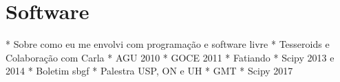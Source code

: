 \chapter{Software}

* Sobre como eu me envolvi com programação e software livre
* Tesseroids e Colaboração com Carla
* AGU 2010
* GOCE 2011
* Fatiando
* Scipy 2013 e 2014
* Boletim sbgf
* Palestra USP, ON e UH
* GMT
* Scipy  2017
